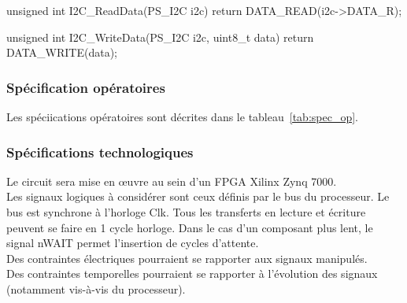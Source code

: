 \begin{Ccode}[caption={Exemple de procédures bas niveau}, label={lst:c}]
unsigned int I2C_ReadData(PS_I2C i2c)
{
    return DATA_READ(i2c->DATA_R);
}

unsigned int I2C_WriteData(PS_I2C i2c, uint8_t data)
{
    return DATA_WRITE(data);
}
\end{Ccode}

\subsubsection{Spécification opératoires}

Les spéciications opératoires sont décrites dans le tableau~\ref{tab:spec_op}.


\subsubsection{Spécifications technologiques}

Le circuit sera mise en œuvre au sein d’un FPGA Xilinx Zynq 7000.
\\

Les signaux logiques à considérer sont ceux définis par le bus du processeur. Le bus est synchrone à
l’horloge Clk. Tous les transferts en lecture et écriture peuvent se faire en 1 cycle horloge. Dans le cas d’un composant plus lent, le signal nWAIT permet l’insertion de cycles d’attente.
\\

Des contraintes électriques pourraient se rapporter aux signaux manipulés.
\\

Des contraintes temporelles pourraient se rapporter à l’évolution des signaux (notamment vis-à-vis du
processeur).
\\
